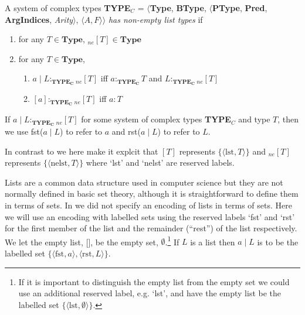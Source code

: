 A system of complex types {\bf TYPE$_C$} = $\langle${\bf Type}, {\bf BType},
$\langle$\textbf{PType}, {\bf Pred}, \textbf{ArgIndices}, {\it
  Arity\/}$\rangle$, $\langle A,F\rangle$$\rangle$ \textit{has
  non-empty list types} if
\begin{enumerate} 
 
\item for any $T \in \textbf{Type}$, $_{\mathit{ne}}[T] \in \textbf{Type}$ 
 
\item for any $T \in \textbf{Type}$, 
\begin{enumerate} 
 
\item $a\mid L:_{\mathbf{TYPE_C}} {_{\mathit{ne}}[T]}$ iff
  $a:_{\mathbf{TYPE_C}}T$ and $L:_{\mathbf{TYPE_C}} {_{\mathit{ne}}[T]}$ 
 
\item $[a]:_{\mathbf{TYPE_C}} {_{\mathit{ne}}[T]}$ iff $a:T$
 
\end{enumerate}

\end{enumerate}

If $a\mid L :_{\mathbf{TYPE_C}} {_{\mathit{ne}}[T]}$ for some system of
complex types {\bf TYPE$_C$} and type $T$, then we use fst($a\mid L$)
to refer to $a$ and rst($a\mid L$) to refer to $L$.

In contrast to \cite{Cooper2012} we here make it explcit that $[T]$
represents $\{\langle\mathrm{lst},T\rangle\}$ and
${_{\mathit{ne}}[T]}$ represents $\{\langle\mathrm{nelst},T\rangle\}$
where `lst' and `nelst' are reserved labels. 

Lists are a common data structure used in computer science but they
are not normally defined in basic set theory, although it is
straightforward to define them in terms of sets.  In \cite{Cooper2012}
we did not specify an encoding of lists in terms of sets.  Here we
will use an encoding with labelled sets using the reserved labels
`fst' and `rst' for the first member of the list and the remainder
(``rest'') of
the list respectively.  We let the empty list, [], be the empty set,
$\emptyset$.\footnote{If it is important to distinguish the empty list
  from the empty set we could use an additional reserved label,
  e.g. `lst',  and
  have the empty list be the labelled set $\{\langle
  \mathrm{lst},\emptyset\rangle\}$.}  If $L$ is a list then $a\mid L$
is to be the labelled set $\{\langle\mathrm{fst},a\rangle,\langle\mathrm{rst},L\rangle\}$.

